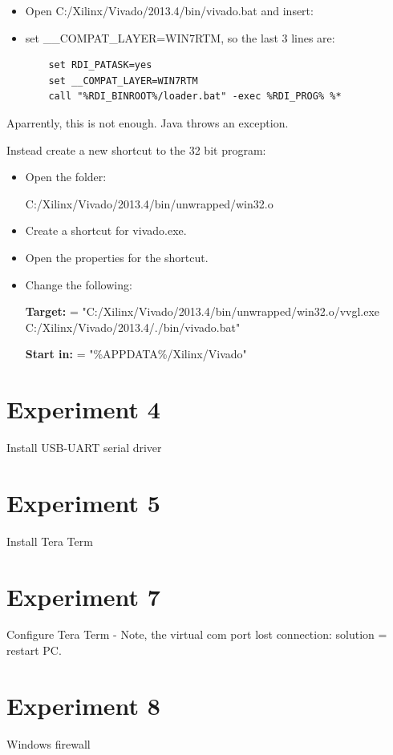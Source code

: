 \documentclass[]{report}
\begin{document}
\begin{itemize}
	\item Open C:/Xilinx/Vivado/2013.4/bin/vivado.bat and insert: 
	\item set \_\_COMPAT\_LAYER=WIN7RTM, so the last 3 lines are:
\begin{lstlisting}
	set RDI_PATASK=yes
	set __COMPAT_LAYER=WIN7RTM
	call "%RDI_BINROOT%/loader.bat" -exec %RDI_PROG% %* 
\end{lstlisting}
\end{itemize}

Aparrently, this is not enough. Java throws an exception.

Instead create a new shortcut to the 32 bit program:

\begin{itemize}
	\item Open the folder: 

	C:/Xilinx/Vivado/2013.4/bin/unwrapped/win32.o
	\item Create a shortcut for vivado.exe.
	\item Open the properties for the shortcut.

	\item Change the following:

	\textbf{Target:} = "C:/Xilinx/Vivado/2013.4/bin/unwrapped/win32.o/vvgl.exe C:/Xilinx/Vivado/2013.4/./bin/vivado.bat"

	\textbf{Start in:} = "\%APPDATA\%/Xilinx/Vivado"
\end{itemize}

\section{Experiment 4}
Install USB-UART serial driver

\section{Experiment 5}
Install Tera Term

\section{Experiment 7}
Configure Tera Term
- Note, the virtual com port lost connection: solution = restart PC.

\section{Experiment 8}
Windows firewall
\end{document}

